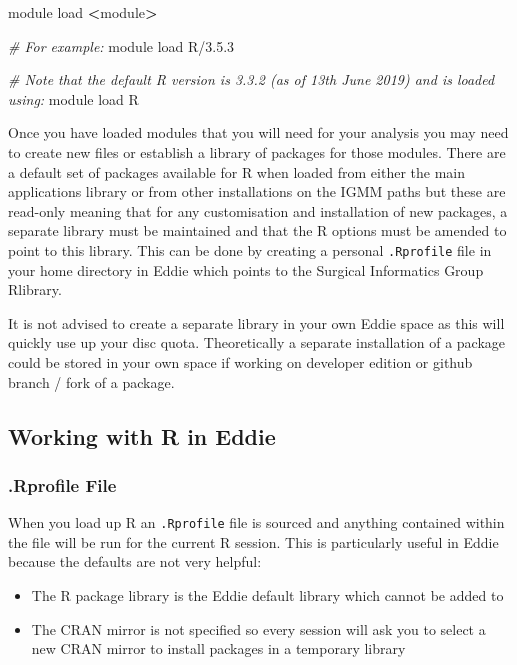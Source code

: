 \documentclass[
]{book}
\newenvironment{Shaded}{\begin{snugshade}}{\end{snugshade}}
\newcommand{\CommentTok}[1]{\textcolor[rgb]{0.56,0.35,0.01}{\textit{#1}}}
\newcommand{\ExtensionTok}[1]{#1}
\newcommand{\NormalTok}[1]{#1}
\newcommand{\OperatorTok}[1]{\textcolor[rgb]{0.81,0.36,0.00}{\textbf{#1}}}
\providecommand{\tightlist}{%
  \setlength{\itemsep}{0pt}\setlength{\parskip}{0pt}}
\begin{document}
\begin{Shaded}
\begin{Highlighting}[]
\ExtensionTok{module}\NormalTok{ load }\OperatorTok{<}\NormalTok{module}\OperatorTok{>}

\CommentTok{# For example:}
\ExtensionTok{module}\NormalTok{ load R/3.5.3}

\CommentTok{# Note that the default R version is 3.3.2 (as of 13th June 2019) and is loaded using:}
\ExtensionTok{module}\NormalTok{ load R}
\end{Highlighting}
\end{Shaded}

Once you have loaded modules that you will need for your analysis you may need to create new files or establish a library of packages for those modules. There are a default set of packages available for R when loaded from either the main applications library or from other installations on the IGMM paths but these are read-only meaning that for any customisation and installation of new packages, a separate library must be maintained and that the R options must be amended to point to this library. This can be done by creating a personal \texttt{.Rprofile} file in your home directory in Eddie which points to the Surgical Informatics Group Rlibrary.

It is not advised to create a separate library in your own Eddie space as this will quickly use up your disc quota. Theoretically a separate installation of a package could be stored in your own space if working on developer edition or github branch / fork of a package.

\hypertarget{working-with-r-in-eddie}{%
\subsection{Working with R in Eddie}\label{working-with-r-in-eddie}}

\hypertarget{rprofile-file}{%
\subsubsection{.Rprofile File}\label{rprofile-file}}

When you load up R an \texttt{.Rprofile} file is sourced and anything contained within the file will be run for the current R session. This is particularly useful in Eddie because the defaults are not very helpful:

\begin{itemize}
\tightlist
\item
  The R package library is the Eddie default library which cannot be added to
\item
  The CRAN mirror is not specified so every session will ask you to select a new CRAN mirror to install packages in a temporary library
\end{itemize}
\end{document}
